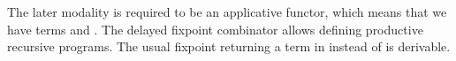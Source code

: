 \begin{AgdaAlign}
The later modality is required to be an applicative functor, which means that we have terms  and .
The delayed fixpoint combinator  \cite{BahrGM17,BirkedalBCGSV16} allows defining productive recursive programs. The usual fixpoint returning a term in  instead of   is derivable.
\begin{code}%
%
\>[4]\AgdaSpace{}%
\AgdaSymbol{:}\AgdaSpace{}%
\AgdaSymbol{\{}\AgdaSpace{}%
\AgdaSymbol{:}\AgdaSpace{}%
\AgdaSpace{}%
\AgdaSymbol{\}}\AgdaSpace{}%
\AgdaSymbol{\{}\AgdaSpace{}%
\AgdaSymbol{:}\AgdaSpace{}%
\AgdaSpace{}%
\AgdaSymbol{\}}\AgdaSpace{}%
\AgdaSpace{}%
\AgdaSpace{}%
\AgdaSpace{}%
\AgdaSpace{}%
\AgdaSpace{}%
\AgdaSpace{}%
\AgdaSpace{}%
\AgdaSymbol{(}\AgdaSpace{}%
\AgdaSymbol{)}\<%
\\
%
\>[4]\AgdaSpace{}%
\AgdaSymbol{:}\AgdaSpace{}%
\AgdaSymbol{\{}\AgdaSpace{}%
\AgdaSymbol{:}\AgdaSpace{}%
\AgdaSpace{}%
\AgdaSymbol{\}}\AgdaSpace{}%
\AgdaSymbol{\{}\AgdaSpace{}%
\AgdaSpace{}%
\AgdaSymbol{:}\AgdaSpace{}%
\AgdaSpace{}%
\AgdaSymbol{\}}\AgdaSpace{}%
\AgdaSpace{}%
\AgdaSpace{}%
\AgdaSpace{}%
\AgdaSymbol{(}\AgdaSpace{}%
\AgdaSymbol{(}\AgdaSpace{}%
\AgdaSpace{}%
\AgdaSymbol{))}\AgdaSpace{}%
\AgdaSpace{}%
\AgdaSpace{}%
\AgdaSpace{}%
\AgdaSymbol{(}\AgdaSpace{}%
\AgdaSymbol{)}\AgdaSpace{}%
\AgdaSpace{}%
\AgdaSpace{}%
\AgdaSpace{}%
\AgdaSymbol{(}\AgdaSpace{}%
\AgdaSymbol{)}\<%
\\
%
\>[4]\AgdaSpace{}%
\AgdaSymbol{:}\AgdaSpace{}%
\AgdaSymbol{\{}\AgdaSpace{}%
\AgdaSymbol{:}\AgdaSpace{}%
\AgdaSpace{}%
\AgdaSymbol{\}}\AgdaSpace{}%
\AgdaSymbol{\{}\AgdaSpace{}%
\AgdaSymbol{:}\AgdaSpace{}%
\AgdaSpace{}%
\AgdaSymbol{\}}\AgdaSpace{}%

\end{code}
\end{AgdaAlign}
